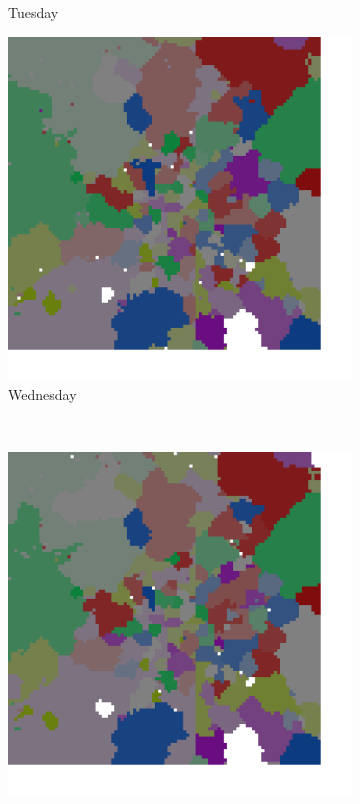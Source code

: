 \documentclass[12pt,a4paper]{article}
\begin{document}
\begin{figure}[H]
\begin{subfigure}[b]{0.30\textwidth}
\caption{Tuesday}
\end{subfigure}
\begin{subfigure}[b]{0.30\textwidth}
\includegraphics[width=\textwidth]{week/3Wed.png}
\caption{Wednesday}
\end{subfigure}
\\
\begin{subfigure}[b]{0.30\textwidth}
\includegraphics[width=\textwidth]{week/4Thu.png}

\end{subfigure}
\end{figure}
\end{document}
